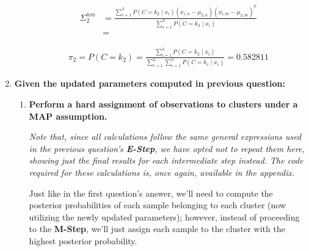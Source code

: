 \documentclass[12pt]{article}
\begin{document}
\begin{enumerate}[leftmargin=\labelsep]
\begin{itemize}[leftmargin=]
                \begin{equation*}
                  \begin{aligned}
                    \Sigma^{nm}_2 & = \frac{\sum_{i=1}^3 P(C = k_2 \mid x_i) (x_{i, n} - \mu_{2, n}) (x_{i, m} - \mu_{2, m})^T}{\sum_{i=1}^3 P(C = k_2 \mid x_i)} \\
                                  & = 
                  \end{aligned}
                \end{equation*}

                \begin{equation*}
                  \begin{aligned}
                    \pi_2 = P(C = k_2) = \frac{\sum_{i=1}^3 P(C = k_2 \mid x_i)}{\sum_{c=1}^2\sum_{i=1}^3 P(C = k_c \mid x_i)} = 0.582811
                  \end{aligned}
                \end{equation*}

        \end{itemize}

        \pagebreak

  \item \textbf{Given the updated parameters computed in previous question:}

        \begin{enumerate}[leftmargin=\labelsep]
          \item \textbf{Perform a hard assignment of observations to clusters under a MAP assumption.}

                \textit{Note that, since all calculations follow the same general expressions used
                  in the previous question's \textbf{E-Step}, we have opted not to repeat them here,
                  showing just the final results for each intermediate step instead.
                  The code required for these calculations is, once again, available in the
                  appendix.}

                Just like in the first question's answer, we'll need to compute the posterior
                probabilities of each sample belonging to each cluster (now utilizing the newly updated
                parameters); however, instead of proceeding to the \textbf{M-Step}, we'll just assign
                each sample to the cluster with the highest posterior probability.


\end{enumerate}
\end{enumerate}
\end{document}
